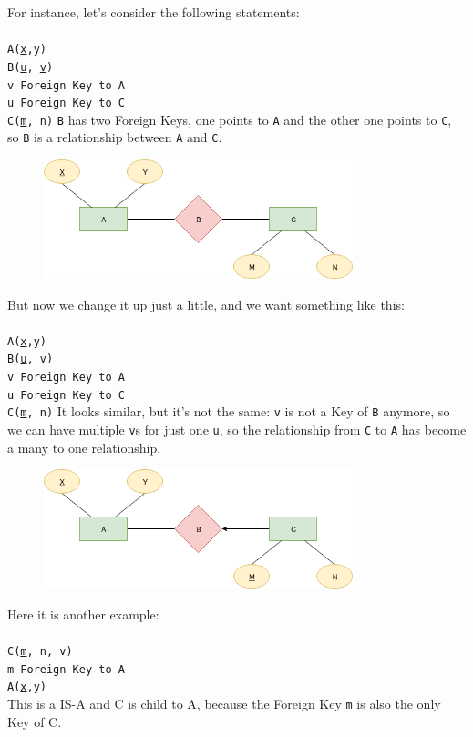 \documentclass[class=book, crop=false, oneside]{standalone}
\newcommand\tab[1][1cm]{\hspace*{#1}}
\begin{document}
For instance, let's consider the following statements:\\\\
\texttt{A(\underline{x},y)}\\
\texttt{B(\underline{u}, \underline{v})}\\
\tab[.4cm] \texttt{v Foreign Key to A}\\
\tab[.4cm] \texttt{u Foreign Key to C}\\
\texttt{C(\underline{m}, n)}
\vskip 5pt
\texttt{B} has two Foreign Keys, one points to \texttt{A} and the other one points to \texttt{C}, so \texttt{B} is a relationship between \texttt{A} and \texttt{C}.
\begin{figure}[H]
	\includegraphics[width=0.8\textwidth,keepaspectratio]{diagram3_00.png}
	\caption{}
	\label{diagram3_00}
\end{figure}
\vskip 5pt
But now we change it up just a little, and we want something like this:\\\\
\texttt{A(\underline{x},y)}\\
\texttt{B(\underline{u}, v)}\\
\tab[.4cm] \texttt{v Foreign Key to A}\\
\tab[.4cm] \texttt{u Foreign Key to C}\\
\texttt{C(\underline{m}, n)}
\vskip 5pt
It looks similar, but it's not the same: \texttt{v} is not a Key of \texttt{B} anymore, so we can have multiple \texttt{v}s for just one \texttt{u}, so the relationship from \texttt{C} to \texttt{A} has become a many to one relationship.
\begin{figure}[H]
	\includegraphics[width=0.8\textwidth,keepaspectratio]{diagram3_01.png}
	\caption{}
	\label{diagram3_01}
\end{figure}
\vskip 5pt
Here it is another example:\\\\
\texttt{C(\underline{m}, n, v)}\\
\tab[.4cm] \texttt{m Foreign Key to A}\\
\texttt{A(\underline{x},y)}\\
\vskip 5pt
This is a IS-A and C is child to A, because the Foreign Key \texttt{m} is also the only Key of C.
\end{document}
